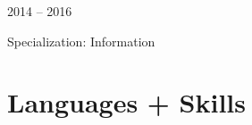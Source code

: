 \documentclass[letterpaper]{styles} %
\begin{document}
\begin{minipage}[t]{0.33\textwidth}

2014 -- 2016
\vspace{1mm}

\vspace{1mm}

Specialization:  Information

\vspace{2mm}


\section{Languages + Skills}

\descript{\\PHP 
\\Java 
\\Python 
\\JavaScript 
\\C++ 
\\C 
\\Matlab 
}


\end{minipage}
\end{document}

